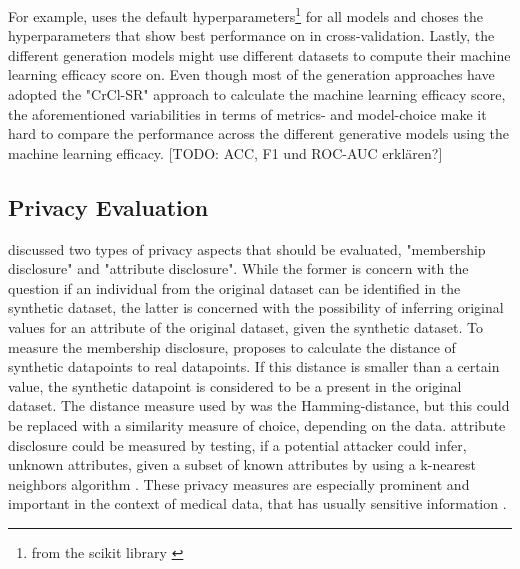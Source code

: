 For example, \cite{kunar2021DTGANDifferentialPrivatea} uses the default hyperparameters\footnote{from the scikit library \cite{scikit-learn}} for all models and 
\cite{kim2021OCTGANNeuralODEbased} choses the hyperparameters that show best performance on in cross-validation.
Lastly, the different generation models might use different datasets to compute their machine learning efficacy score on.
Even though most of the generation approaches have adopted the "CrCl-SR"\cite{goncalves2020GenerationEvaluationSynthetic} approach to calculate the machine learning efficacy score,
the aforementioned variabilities in terms of metrics- and model-choice make it hard to compare the performance across the different generative models using the machine learning efficacy.
[TODO: ACC, F1 und ROC-AUC erklären?]

\subsection{Privacy Evaluation}
\label{ch:preliminaries-evaluationOfSyntheticTabularData-privacyEvaluation}
\cite{goncalves2020GenerationEvaluationSynthetic} discussed two types of privacy aspects that should be evaluated, "membership disclosure" and "attribute disclosure".
While the former is concern with the question if an individual from the original dataset can be identified in the synthetic dataset, the latter is concerned with the possibility of inferring original values for an attribute of the original dataset, given the synthetic dataset.
To measure the membership disclosure, \cite{goncalves2020GenerationEvaluationSynthetic} proposes to calculate the distance of synthetic datapoints to real datapoints.
If this distance is smaller than a certain value, the synthetic datapoint is considered to be a present in the original dataset.
The distance measure used by \cite{goncalves2020GenerationEvaluationSynthetic} was the Hamming-distance, but this could be replaced with a similarity measure of choice, depending on the data.
attribute disclosure could be measured by testing, if a potential attacker could infer, unknown attributes, given a subset of known attributes by using a k-nearest neighbors algorithm \cite{goncalves2020GenerationEvaluationSynthetic}.
These privacy measures are especially prominent and important in the context of medical data, that has usually sensitive information \cite{goncalves2020GenerationEvaluationSynthetic, pmlr-v68-choi17a}.

